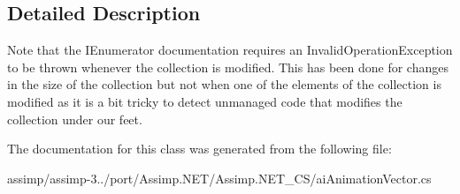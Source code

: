 \subsection{Detailed Description}
Note that the I\+Enumerator documentation requires an Invalid\+Operation\+Exception to be thrown whenever the collection is modified. This has been done for changes in the size of the collection but not when one of the elements of the collection is modified as it is a bit tricky to detect unmanaged code that modifies the collection under our feet. 

The documentation for this class was generated from the following file\+:\begin{DoxyCompactItemize}
\item 
assimp/assimp-\/3../port/\+Assimp.\+N\+E\+T/\+Assimp.\+N\+E\+T\+\_\+\+C\+S/ai\+Animation\+Vector.\+cs\end{DoxyCompactItemize}
